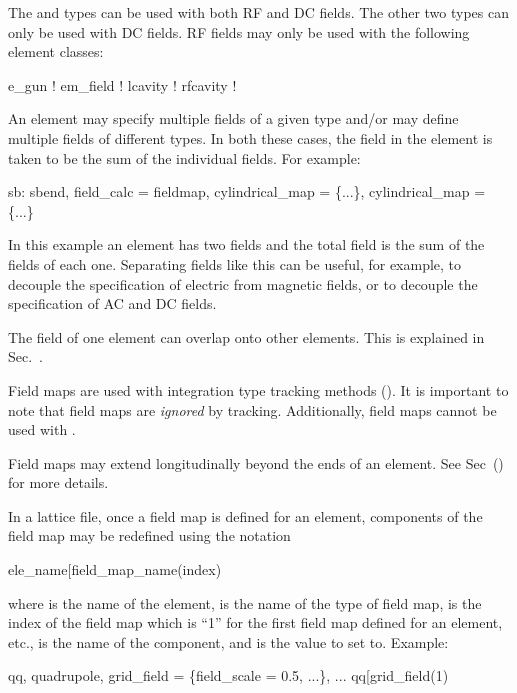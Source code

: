 The  and  types can be used with both RF and DC fields.
The other two types can only be used with DC fields. RF fields may only be used with the following
element classes:
\begin{example}
  e_gun         ! 
  em_field      ! 
  lcavity       ! 
  rfcavity      ! 
\end{example}

An element may specify multiple fields of a given type and/or may define multiple fields
of different types. In both these cases, the field in the element is taken to be the sum
of the individual fields. For example:
\begin{example}
  sb: sbend, field_calc = fieldmap, cylindrical_map = \{...\},  cylindrical_map = \{...\}
\end{example}
In this example an element has two  fields and the total field is the
sum of the fields of each one. Separating fields like this can be useful, for example, to
decouple the specification of electric from magnetic fields, or to decouple the
specification of AC and DC fields.

The field of one element can overlap onto other elements. This is explained in
Sec.~.

Field maps are used with integration type tracking methods ().  It is important to
note that field maps are {\em ignored} by  tracking. Additionally, 
field maps cannot be used with .

Field maps may extend longitudinally beyond the ends of an element. See Sec~() for
more details.

In a lattice file, once a field map is defined for an element, components of the field map
may be redefined using the notation
\begin{example}
  ele_name[field_map_name(index)%
\end{example}
where  is the name of the element,  is the name of the
type of field map,  is the index of the field map which is ``1'' for the first
field map defined for an element, etc.,  is the name of the component,
and  is the value to set to. Example:
\begin{example}
  qq, quadrupole, grid_field = \{field_scale = 0.5, ...\}, ...
  qq[grid_field(1)%
\end{example}

